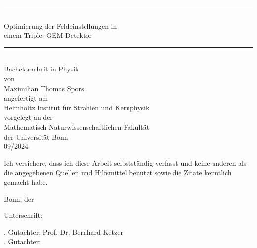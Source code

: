 \documentclass[fontsize=10.5, ngerman]{scrreport}
\begin{document}
	
	\begin{titlepage}
		\centering
		\vspace*{\fill}
		\begin{center}
			\rule[0.5ex]{.8\textwidth}{2pt}\\
			\LARGE Optimierung der Feldeinstellungen in\\
			einem Triple- GEM-Detektor\\
			\rule[0.5ex]{.8\textwidth}{2pt}\\
			\vspace{0.5 cm}
			\large Bachelorarbeit in Physik\\
			\vspace{0.5 cm}
			von \\
			\vspace{0.5 cm}
			Maximilian Thomas Spors\\
			\vspace{0.5 cm}
			angefertigt am \\
			\vspace{0.5 cm}
			Helmholtz Institut für Strahlen und Kernphysik\\
			\vspace{1 cm}
			vorgelegt an der \\
			Mathematisch-Naturwissenschaftlichen Fakultät\\
			der Universität Bonn\\
			\vspace{1 cm}
			09/2024		
		\end{center}
		
		\vspace*{\fill}
	\end{titlepage}
	\newpage
	\pagestyle{empty}
	\vspace*{\fill}
	\noindent	Ich versichere, dass ich diese Arbeit selbstständig verfasst und keine anderen als die angegebenen
	Quellen und Hilfsmittel benutzt sowie die Zitate kenntlich gemacht habe.
	
	
	\vspace{1.5 cm}
	
	
	\noindent \begin{minipage}[c]{6cm}
		Bonn, der\centering \dotfill
	\end{minipage} \hfill 
	\begin{minipage}[c]{6cm}
		Unterschrift: \centering \dotfill
	\end{minipage}
	
	\vspace{2cm}
	
	. Gutachter: Prof. Dr. Bernhard Ketzer\\
	. Gutachter:
	\newpage
	\pagestyle{scrheadings}
	\tableofcontents
	\newpage
	
	
	
	\newpage
	
	\newpage
	
	\newpage
	\appendix
	\printbibliography
	
\end{document}
